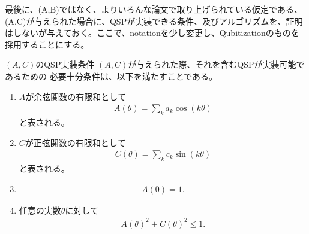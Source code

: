 \documentclass[a4paper,10.5pt]{article}
\numberwithin{equation}{section}
\begin{document}
最後に、(A,B)ではなく、よりいろんな論文で取り上げられている仮定である、(A,C)が与えられた場合に、QSPが実装できる条件、及びアルゴリズムを、証明はしないが与えておく。ここで、notationを少し変更し、Qubitizationのものを採用することにする。
\begin{resultbox}{$(A,C)$のQSP実装条件}
    $(A,C)$が与えられた際、それを含むQSPが実装可能であるための
    必要十分条件は、以下を満たすことである。
    \begin{enumerate}
        \item $A$が余弦関数の有限和として
        \begin{align*}
            A(\theta)
            =
            \sum_{k}a_k\cos(k\theta)
        \end{align*}
        と表される。

        \item $C$が正弦関数の有限和として
        \begin{align*}
            C(\theta)
            =
            \sum_{k}c_k\sin(k\theta)
        \end{align*}
        と表される。

        \item
        \begin{align*}
            A(0)=1.
        \end{align*}

        \item 任意の実数$\theta$に対して
        \begin{align*}
            A(\theta)^2+C(\theta)^2\leq1.
        \end{align*}
    \end{enumerate}
\end{resultbox}
\end{document}
